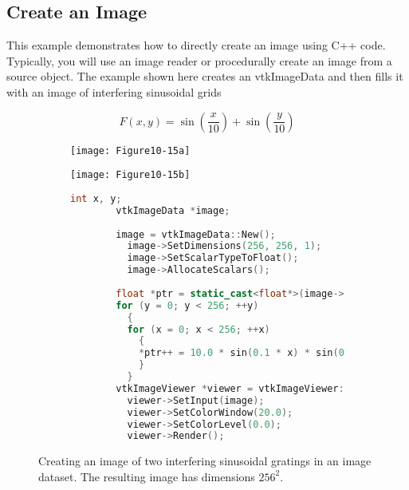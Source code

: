 \subsection{Create an Image}

This example demonstrates how to directly create an image using C++ code. Typically, you will use an image reader or procedurally create an image from a source object. The example shown here creates an vtkImageData and then fills it with an image of interfering sinusoidal grids

\begin{equation}\label{eq:10.3}
F(x, y) = \sin\left(\frac{x}{10}\right) + \sin\left(\dfrac{y}{10}\right)
\end{equation}

\begin{figure}[htb]
    \centering
	\begin{subfigure}[h]{0.48\linewidth}
		\texttt{[image: Figure10-15a]}
		\captionsetup{justification=centering}
		\caption*{}
		\label{fig:Figure10-15a}
	\end{subfigure}
	\hfill
	\begin{subfigure}[h]{0.48\linewidth}
		\texttt{[image: Figure10-15b]}
		\captionsetup{justification=centering}
		\caption*{}
        \label{fig:Figure10-15b}
	\end{subfigure}
	\hfill
	\begin{subfigure}[h]{0.96\linewidth}
       \begin{lstlisting}[language=C++,  caption={}, numbers=none, frame=none]
        int x, y;
        vtkImageData *image;
        
        image = vtkImageData::New();
          image->SetDimensions(256, 256, 1);
          image->SetScalarTypeToFloat();
          image->AllocateScalars();
        
        float *ptr = static_cast<float*>(image->GetScalarPointer());
        for (y = 0; y < 256; ++y)
          {
          for (x = 0; x < 256; ++x)
            {
            *ptr++ = 10.0 * sin(0.1 * x) * sin(0.1 * y);
            }
          }
        vtkImageViewer *viewer = vtkImageViewer::New();
          viewer->SetInput(image);
          viewer->SetColorWindow(20.0);
          viewer->SetColorLevel(0.0);
          viewer->Render();
        \end{lstlisting}
        \label{fig:Figure10-15d}
	\end{subfigure}
	\caption{Creating an image of two interfering sinusoidal gratings in an image dataset. The resulting image has dimensions $256^2$.}\label{fig:Figure10-15}
\end{figure}

